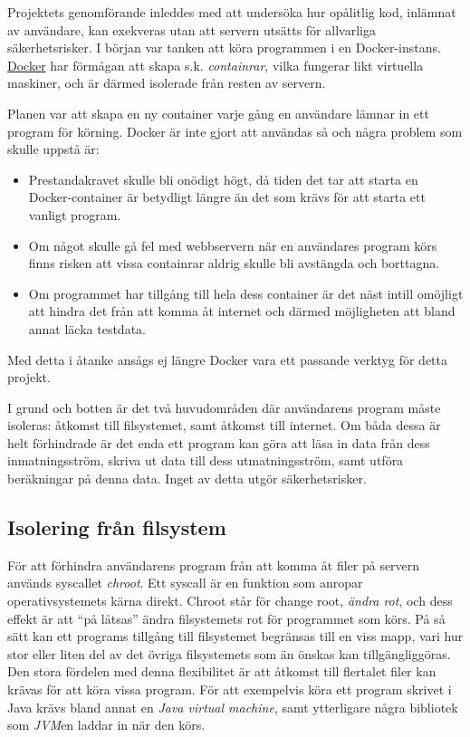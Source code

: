\documentclass{article}
\begin{document}
Projektets genomförande inleddes med att undersöka hur opålitlig kod, inlämnat
av användare, kan exekveras utan att servern utsätts för allvarliga
säkerhetsrisker. I början var tanken att köra programmen i en Docker-instans.
\href{https://www.docker.com}{Docker} har förmågan att skapa s.k.
\textit{containrar}, vilka fungerar likt virtuella maskiner, och är därmed
isolerade från resten av servern.

Planen var att skapa en ny container varje gång en användare lämnar in ett
program för körning. Docker är inte gjort att användas så och några problem som
skulle uppstå är:
\begin{itemize}
	\item Prestandakravet skulle bli onödigt högt, då tiden det tar att starta
		en Docker-container är betydligt längre än det som krävs för att starta
		ett vanligt program.
	\item Om något skulle gå fel med webbservern när en användares program körs
		finns risken att vissa containrar aldrig skulle bli avstängda och
		borttagna.
	\item Om programmet har tillgång till hela dess container är det näst
		intill omöjligt att hindra det från att komma åt internet och därmed
		möjligheten att bland annat läcka testdata.
\end{itemize}
Med detta i åtanke ansågs ej längre Docker vara ett passande verktyg för detta
projekt.

I grund och botten är det två huvudområden där användarens program måste
isoleras: åtkomst till filsystemet, samt åtkomst till internet. Om båda dessa är
helt förhindrade är det enda ett program kan göra att läsa in data från dess
inmatningsström, skriva ut data till dess utmatningsström, samt utföra
beräkningar på denna data. Inget av detta utgör säkerhetsrisker.

\subsection{Isolering från filsystem}

För att förhindra användarens program från att komma åt filer på servern används
syscallet \textit{chroot}. Ett syscall är en funktion som anropar
operativsystemets kärna direkt. Chroot står för change root,
\textit{ändra rot}, och dess effekt är att ``på låtsas'' ändra filsystemets rot
för programmet som körs. På så sätt kan ett programs tillgång till filsystemet
begränsas till en viss mapp, vari hur stor eller liten del av det övriga
filsystemets som än önskas kan tillgängliggöras. Den stora fördelen med denna
flexibilitet är att åtkomst till flertalet filer kan krävas för att köra vissa
program. För att exempelvis köra ett program skrivet i Java krävs bland annat en
\textit{Java virtual machine}, samt ytterligare några bibliotek som
\textit{JVM}en laddar in när den körs.
\end{document}
